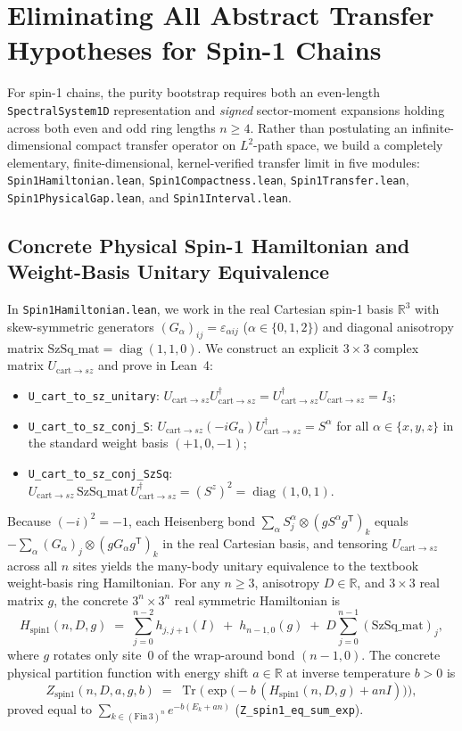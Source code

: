 \documentclass[11pt,a4paper]{article}
\newcommand{\id}[1]{{\small\nolinkurl{#1}}}
\newcommand{\Tr}{\operatorname{Tr}}
\newcommand{\diag}{\operatorname{diag}}
\newcommand{\R}{\mathbb{R}}
\begin{document}
\section{Eliminating All Abstract Transfer Hypotheses for Spin-1 Chains}
For spin-1 chains, the purity bootstrap requires both an even-length \id{SpectralSystem1D} representation and \emph{signed} sector-moment expansions holding across both even and odd ring lengths $n \ge 4$.
Rather than postulating an infinite-dimensional compact transfer operator on $L^2$-path space, we build a completely elementary, finite-dimensional, kernel-verified transfer limit in five modules: \id{Spin1Hamiltonian.lean}, \id{Spin1Compactness.lean}, \id{Spin1Transfer.lean}, \id{Spin1PhysicalGap.lean}, and \id{Spin1Interval.lean}.

\subsection{Concrete Physical Spin-1 Hamiltonian and Weight-Basis Unitary Equivalence}
In \id{Spin1Hamiltonian.lean}, we work in the real Cartesian spin-1 basis $\R^3$ with skew-symmetric generators $(G_\alpha)_{ij} = \varepsilon_{\alpha ij}$ ($\alpha \in \{0,1,2\}$) and diagonal anisotropy matrix $\mathrm{SzSq\_mat} = \diag(1, 1, 0)$.
We construct an explicit $3 \times 3$ complex matrix $U_{\mathrm{cart}\to sz}$ and prove in Lean~4:
\begin{itemize}[leftmargin=1.6em,itemsep=2pt]
  \item \id{U_cart_to_sz_unitary}: $U_{\mathrm{cart}\to sz} U_{\mathrm{cart}\to sz}^\dagger = U_{\mathrm{cart}\to sz}^\dagger U_{\mathrm{cart}\to sz} = I_3$;
  \item \id{U_cart_to_sz_conj_S}: $U_{\mathrm{cart}\to sz}(-i G_\alpha)U_{\mathrm{cart}\to sz}^\dagger = S^\alpha$ for all $\alpha \in \{x, y, z\}$ in the standard weight basis $(+1, 0, -1)$;
  \item \id{U_cart_to_sz_conj_SzSq}: $U_{\mathrm{cart}\to sz}\,\mathrm{SzSq\_mat}\,U_{\mathrm{cart}\to sz}^\dagger = (S^z)^2 = \diag(1, 0, 1)$.
\end{itemize}
Because $(-i)^2 = -1$, each Heisenberg bond $\sum_\alpha S^\alpha_j \otimes (g S^\alpha g^\mathsf{T})_k$ equals $-\sum_\alpha (G_\alpha)_j \otimes (g G_\alpha g^\mathsf{T})_k$ in the real Cartesian basis, and tensoring $U_{\mathrm{cart}\to sz}$ across all $n$ sites yields the many-body unitary equivalence to the textbook weight-basis ring Hamiltonian.
For any $n \ge 3$, anisotropy $D \in \R$, and $3 \times 3$ real matrix $g$, the concrete $3^n \times 3^n$ real symmetric Hamiltonian is
\begin{equation}
  H_{\mathrm{spin1}}(n, D, g) \;=\; \sum_{j=0}^{n-2} h_{j, j+1}(I) \;+\; h_{n-1, 0}(g) \;+\; D \sum_{j=0}^{n-1} (\mathrm{SzSq\_mat})_j,
  \label{eq:Hspin1}
\end{equation}
where $g$ rotates only site~$0$ of the wrap-around bond $(n-1, 0)$.
The concrete physical partition function with energy shift $a \in \R$ at inverse temperature $b > 0$ is
\[
  Z_{\mathrm{spin1}}(n, D, a, g, b) \;=\; \Tr\!\Big(\exp\big(-b\,(H_{\mathrm{spin1}}(n, D, g) + a n I)\big)\Big),
\]
proved equal to $\sum_{k \in (\mathrm{Fin}\,3)^n} e^{-b(E_k + a n)}$ (\id{Z_spin1_eq_sum_exp}).
\end{document}
